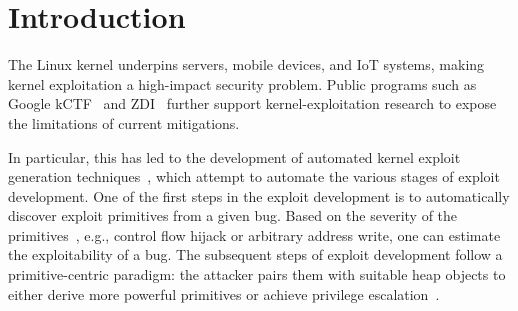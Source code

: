 \section{Introduction}

The Linux kernel underpins servers, mobile devices, and IoT systems, making kernel exploitation a high-impact security problem.
Public programs such as Google kCTF~\cite{kctf} and ZDI~\cite{zdi} further support kernel-exploitation research to expose the limitations of current mitigations.




In particular, this has led to the development of automated kernel exploit generation techniques~\cite{zou2022syzscope, syzbridge, wang2023alphaexp, lin2022grebe, chen2020koobe, fuze_exp, AEM}, which attempt to automate the various stages of exploit development. 
One of the first steps in the exploit development is to automatically discover exploit primitives from a given bug. Based on the severity of the primitives~\cite{zou2022syzscope, lin2022grebe}, e.g., control flow hijack or arbitrary address write, one can estimate the exploitability of a bug. %
The subsequent steps of exploit development follow a primitive-centric paradigm: the attacker pairs them with suitable heap objects to either derive more powerful primitives or achieve privilege escalation~\cite{wang2023alphaexp, chen2019slake, chen2020systematic, avllazagaj2024scavy, pagespray}.

